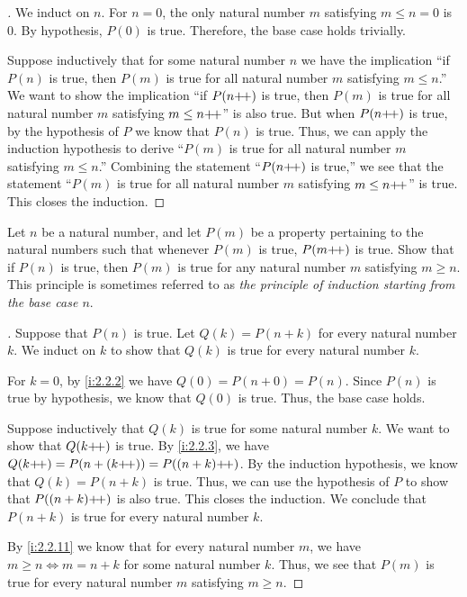 \begin{proof}[]
  We induct on \(n\).
  For \(n = 0\), the only natural number \(m\) satisfying \(m \leq n = 0\) is \(0\).
  By hypothesis, \(P(0)\) is true.
  Therefore, the base case holds trivially.

  Suppose inductively that for some natural number \(n\) we have the implication ``if \(P(n)\) is true, then \(P(m)\) is true for all natural number \(m\) satisfying \(m \leq n\).''
  We want to show the implication ``if \(P(n{+}\!{+})\) is true, then \(P(m)\) is true for all natural number \(m\) satisfying \(m \leq n{+}\!{+}\)'' is also true.
  But when \(P(n{+}\!{+})\) is true, by the hypothesis of \(P\) we know that \(P(n)\) is true.
  Thus, we can apply the induction hypothesis to derive ``\(P(m)\) is true for all natural number \(m\) satisfying \(m \leq n\).''
  Combining the statement ``\(P(n{+}\!{+})\) is true,'' we see that the statement ``\(P(m)\) is true for all natural number \(m\) satisfying \(m \leq n{+}\!{+}\)'' is true.
  This closes the induction.
\end{proof}

\begin{ex}\label{i:ex:2.2.7}
  Let \(n\) be a natural number, and let \(P(m)\) be a property pertaining to the natural numbers such that whenever \(P(m)\) is true, \(P(m{+}\!{+})\) is true.
  Show that if \(P(n)\) is true, then \(P(m)\) is true for any natural number \(m\) satisfying \(m \geq n\).
  This principle is sometimes referred to as \emph{the principle of induction starting from the base case \(n\)}.
\end{ex}

\begin{proof}[]
  Suppose that \(P(n)\) is true.
  Let \(Q(k) = P(n + k)\) for every natural number \(k\).
  We induct on \(k\) to show that \(Q(k)\) is true for every natural number \(k\).

  For \(k = 0\), by \cref{i:2.2.2} we have \(Q(0) = P(n + 0) = P(n)\).
  Since \(P(n)\) is true by hypothesis, we know that \(Q(0)\) is true.
  Thus, the base case holds.

  Suppose inductively that \(Q(k)\) is true for some natural number \(k\).
  We want to show that \(Q(k{+}\!{+})\) is true.
  By \cref{i:2.2.3}, we have \(Q(k{+}\!{+}) = P(n + (k{+}\!{+})) = P((n + k){+}\!{+})\).
  By the induction hypothesis, we know that \(Q(k) = P(n + k)\) is true.
  Thus, we can use the hypothesis of \(P\) to show that \(P((n + k){+}\!{+})\) is also true.
  This closes the induction.
  We conclude that \(P(n + k)\) is true for every natural number \(k\).

  By \cref{i:2.2.11} we know that for every natural number \(m\), we have \(m \geq n \iff m = n + k\) for some natural number \(k\).
  Thus, we see that \(P(m)\) is true for every natural number \(m\) satisfying \(m \geq n\).
\end{proof}
